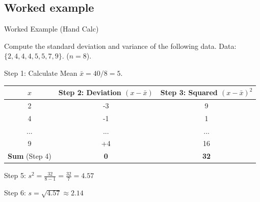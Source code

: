 \subsection{Worked example}
\begin{frame}[allowframebreaks]{Worked Example (Hand Calc)}
\begin{example}
Compute the standard deviation and variance of the following data.
    Data: $\{ 2, 4, 4, 4, 5, 5, 7, 9 \}$. ($n=8$).
    \end{example}
   \pause
   \begin{solution}
  
    Step 1: Calculate Mean $\bar{x} = 40 / 8 = 5$.
    
    \begin{table}[h]
        \centering
        \begin{tabular}{ccc}
            \toprule
            $x$ & Step 2: Deviation $(x-\bar{x})$  & Step  3: Squared $(x-\bar{x})^2$ \\
            \midrule
            2 & -3 & 9 \\
            4 & -1 & 1 \\
            ... & ... & ... \\
            9 & +4 & 16 \\
            \midrule
            \textbf{Sum} (Step 4)& \textbf{0} & \textbf{32} \\
            \bottomrule
        \end{tabular}
      
    \end{table}
Step 5: $ s^2 = \frac{32}{8-1} = \frac{32}{7} = 4.57 $ 

Step 6: $ s = \sqrt{4.57} \approx 2.14 $
    \end{solution}
\end{frame}


